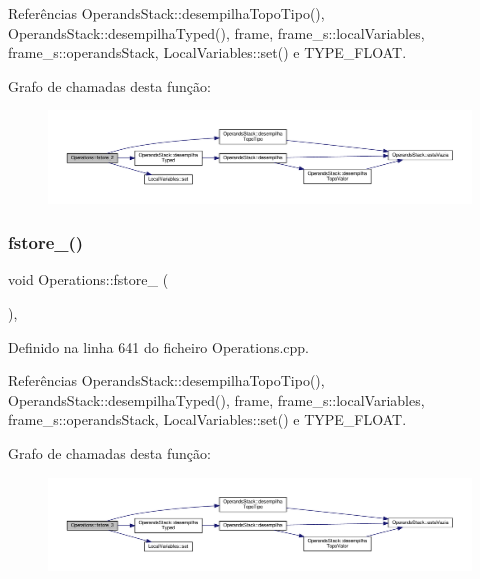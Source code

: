 Referências Operands\+Stack\+::desempilha\+Topo\+Tipo(), Operands\+Stack\+::desempilha\+Typed(), frame, frame\+\_\+s\+::local\+Variables, frame\+\_\+s\+::operands\+Stack, Local\+Variables\+::set() e T\+Y\+P\+E\+\_\+\+F\+L\+O\+AT.

Grafo de chamadas desta função\+:\nopagebreak
\begin{figure}[H]
\begin{center}
\leavevmode
\includegraphics[width=350pt]{classOperations_a6d0a2faa9f164d49accf491a95364e2f_cgraph}
\end{center}
\end{figure}
\mbox{\label{classOperations_a00786621697e0e6e6c084c3cee1599ae}} 
\subsubsection{\texorpdfstring{fstore\+\_()}{fstore\_3()}}
{\footnotesize\ttfamily void Operations\+::fstore\+\_ (\begin{DoxyParamCaption}{ }\end{DoxyParamCaption})\hspace{0.3cm}{\ttfamily [static]}, {\ttfamily [private]}}



Definido na linha 641 do ficheiro Operations.\+cpp.



Referências Operands\+Stack\+::desempilha\+Topo\+Tipo(), Operands\+Stack\+::desempilha\+Typed(), frame, frame\+\_\+s\+::local\+Variables, frame\+\_\+s\+::operands\+Stack, Local\+Variables\+::set() e T\+Y\+P\+E\+\_\+\+F\+L\+O\+AT.

Grafo de chamadas desta função\+:\nopagebreak
\begin{figure}[H]
\begin{center}
\leavevmode
\includegraphics[width=350pt]{classOperations_a00786621697e0e6e6c084c3cee1599ae_cgraph}
\end{center}
\end{figure}
\mbox{\label{classOperations_a138cd74b7244e430085eb4850de2b481}} 
